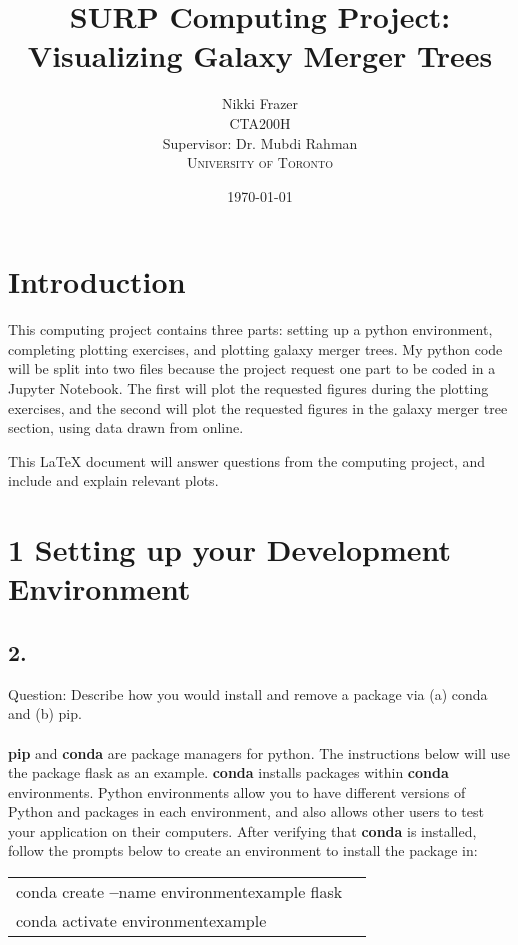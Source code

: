 \documentclass[12pt, letterpaper]{article}
\title{SURP Computing Project: Visualizing Galaxy
Merger Trees}
\author{Nikki Frazer\\ 
CTA200H\\ 
Supervisor: Dr. Mubdi Rahman\\
\textsc{University of Toronto}
}
\date{\today}
\begin{document}
\maketitle

\section*{Introduction}
This computing project contains three parts: setting up a python environment, completing plotting exercises, and plotting galaxy merger trees. My python code will be split into two files because the project request one part to be coded in a Jupyter Notebook. The first will plot the requested figures during the plotting exercises, and the second will plot the requested figures in the galaxy merger tree section, using data drawn from online. 

This \LaTeX{} document will answer questions from the computing project, and include and explain relevant plots. 

\section*{1 Setting up your Development Environment}
\subsection*{   2.}
Question: Describe how you would install and remove a package via (a) conda and (b) pip.\\
\\
\textbf{pip} and \textbf{conda} are package managers for python. The instructions below will use the package flask as an example. \textbf{conda} installs packages within \textbf{conda} environments. Python environments allow you to have different versions of Python and packages in each environment, and also allows other users to test your application on their computers. After verifying that \textbf{conda} is installed, follow the prompts below to create an environment to install the package in: 
\begin{center}
\begin{tabular}{ l l }
 conda create \textbf{--}name environmentexample flask \\ 
 conda activate environmentexample \\  
\end{tabular}
\end{center} 
\end{document}
